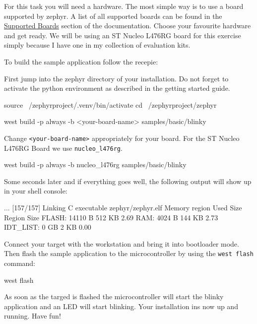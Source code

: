 For this task you will need a hardware. The most simple way is to use a board supported by zephyr. 
A list of all supported boards can be found in the \href{https://docs.zephyrproject.org/latest/boards/index.html}{Supported Boards} section of the \Zephyr documentation. Choose your favourite hardware and get ready. We will be using an ST Nucleo L476RG board for this exercise simply because I have one in my collection  of evaluation kits. 


To build the sample application follow the recepie:

First jump into the zephyr directory of your installation. Do not forget to activate the python environment as described in the getting started guide. 
\begin{bashbox}
source ~/zephyrproject/.venv/bin/activate
cd ~/zephyrproject/zephyr
\end{bashbox}


\begin{bashbox}
west build -p always -b <your-board-name> samples/basic/blinky
\end{bashbox}

Change \texttt{<your-board-name>} appropriately for your board. 
For the ST Nucleo L476RG Board we use \texttt{nucleo_l476rg}.


\begin{bashbox}
west build -p always -b nucleo_l476rg samples/basic/blinky
\end{bashbox}


Some seconds later and if everything goes well, the following output will show up in your shell console:

\begin{textbox}
...
[157/157] Linking C executable zephyr/zephyr.elf
Memory region         Used Size  Region Size  %
           FLASH:       14110 B       512 KB      2.69%
             RAM:        4024 B       144 KB      2.73%
        IDT_LIST:          0 GB         2 KB      0.00%
\end{textbox}


Connect your target with the workstation and bring it into bootloader mode. Then flash the sample application to the microcontroller by using the \texttt{west flash} command:

\begin{bashbox}
west flash
\end{bashbox}

As soon as the targed is flashed the microcontroller will start the blinky application and an LED will start blinking. Your installation ins now up and running. Have fun!


